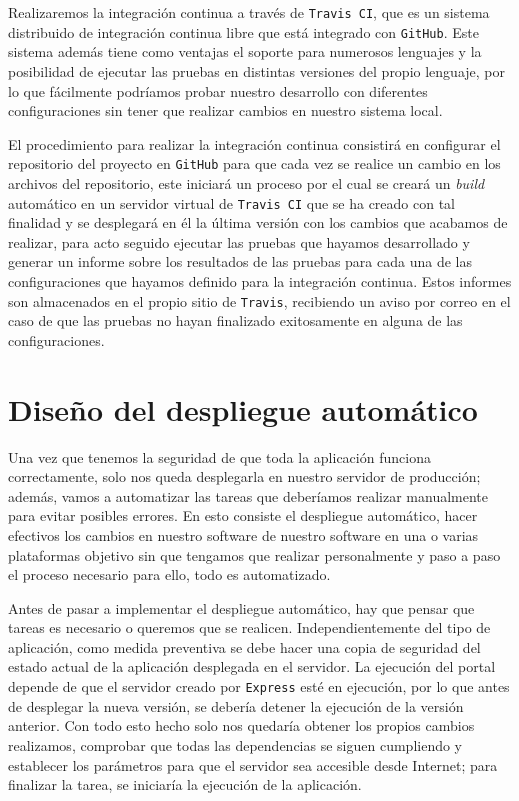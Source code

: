 \bigskip
Realizaremos la integración continua a través de {\tt Travis CI}, que es un sistema distribuido de integración continua libre que está integrado con {\tt GitHub}. Este sistema además tiene como ventajas el soporte para numerosos lenguajes y la posibilidad de ejecutar las pruebas en distintas versiones del propio lenguaje, por lo que fácilmente podríamos probar nuestro desarrollo con diferentes configuraciones sin tener que realizar cambios en nuestro sistema local.

\bigskip
El procedimiento para realizar la integración continua consistirá en configurar el repositorio del proyecto en {\tt GitHub} para que cada vez se realice un cambio en los archivos del repositorio, este iniciará un proceso por el cual se creará un \textit{build} automático en un servidor virtual de {\tt Travis CI} que se ha creado con tal finalidad y se desplegará en él la última versión con los cambios que acabamos de realizar, para acto seguido ejecutar las pruebas que hayamos desarrollado y generar un informe sobre los resultados de las pruebas para cada una de las configuraciones que hayamos definido para la integración continua. Estos informes son almacenados en el propio sitio de {\tt Travis}, recibiendo un aviso por correo en el caso de que las pruebas no hayan finalizado exitosamente en alguna de las configuraciones.

\section{Diseño del despliegue automático}

Una vez que tenemos la seguridad de que toda la aplicación funciona correctamente, solo nos queda desplegarla en nuestro servidor de producción; además, vamos a automatizar las tareas que deberíamos realizar manualmente para evitar posibles errores. En esto consiste el despliegue automático, hacer efectivos los cambios en nuestro software de nuestro software en una o varias plataformas objetivo sin que tengamos que realizar personalmente y paso a paso el proceso necesario para ello, todo es 
automatizado.

\bigskip
Antes de pasar a implementar el despliegue automático, hay que pensar que tareas es necesario o queremos que se realicen. Independientemente del tipo de aplicación, como medida preventiva se debe hacer una copia de seguridad del estado actual de la aplicación desplegada en el servidor. La ejecución del portal depende de que el servidor creado por {\tt Express} esté en ejecución, por lo que antes de desplegar la nueva versión, se debería detener la ejecución de la versión anterior. Con todo esto hecho solo nos quedaría obtener los propios cambios realizamos, comprobar que todas las dependencias se siguen cumpliendo y establecer los parámetros para que el servidor sea accesible desde Internet; para finalizar la tarea, se iniciaría la ejecución de la aplicación.

